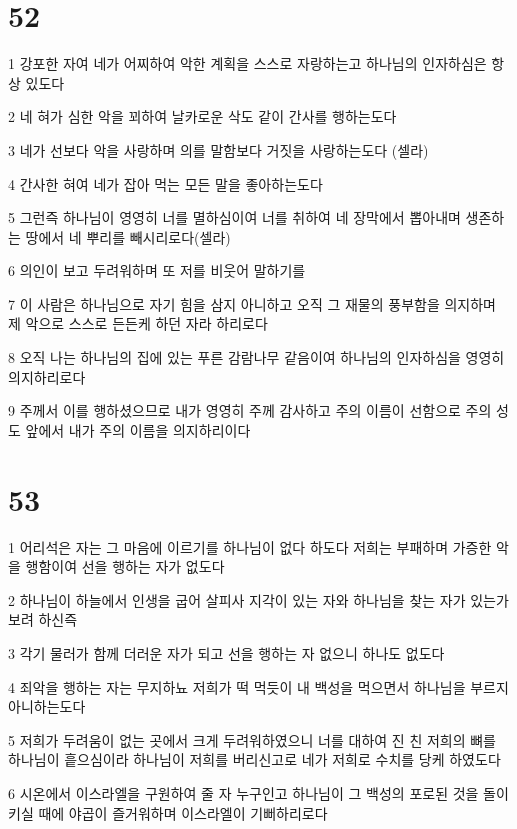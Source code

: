 \chapter{52}

\par 1 강포한 자여 네가 어찌하여 악한 계획을 스스로 자랑하는고 하나님의 인자하심은 항상 있도다
\par 2 네 혀가 심한 악을 꾀하여 날카로운 삭도 같이 간사를 행하는도다
\par 3 네가 선보다 악을 사랑하며 의를 말함보다 거짓을 사랑하는도다 (셀라)
\par 4 간사한 혀여 네가 잡아 먹는 모든 말을 좋아하는도다
\par 5 그런즉 하나님이 영영히 너를 멸하심이여 너를 취하여 네 장막에서 뽑아내며 생존하는 땅에서 네 뿌리를 빼시리로다(셀라)
\par 6 의인이 보고 두려워하며 또 저를 비웃어 말하기를
\par 7 이 사람은 하나님으로 자기 힘을 삼지 아니하고 오직 그 재물의 풍부함을 의지하며 제 악으로 스스로 든든케 하던 자라 하리로다
\par 8 오직 나는 하나님의 집에 있는 푸른 감람나무 같음이여 하나님의 인자하심을 영영히 의지하리로다
\par 9 주께서 이를 행하셨으므로 내가 영영히 주께 감사하고 주의 이름이 선함으로 주의 성도 앞에서 내가 주의 이름을 의지하리이다

\chapter{53}

\par 1 어리석은 자는 그 마음에 이르기를 하나님이 없다 하도다 저희는 부패하며 가증한 악을 행함이여 선을 행하는 자가 없도다
\par 2 하나님이 하늘에서 인생을 굽어 살피사 지각이 있는 자와 하나님을 찾는 자가 있는가 보려 하신즉
\par 3 각기 물러가 함께 더러운 자가 되고 선을 행하는 자 없으니 하나도 없도다
\par 4 죄악을 행하는 자는 무지하뇨 저희가 떡 먹듯이 내 백성을 먹으면서 하나님을 부르지 아니하는도다
\par 5 저희가 두려움이 없는 곳에서 크게 두려워하였으니 너를 대하여 진 친 저희의 뼈를 하나님이 흩으심이라 하나님이 저희를 버리신고로 네가 저희로 수치를 당케 하였도다
\par 6 시온에서 이스라엘을 구원하여 줄 자 누구인고 하나님이 그 백성의 포로된 것을 돌이키실 때에 야곱이 즐거워하며 이스라엘이 기뻐하리로다


